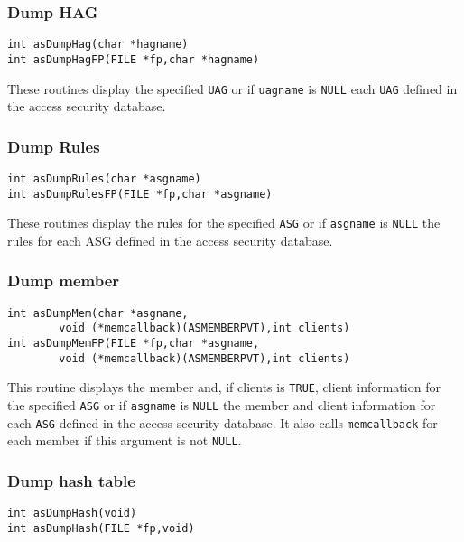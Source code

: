 \subsubsection{Dump HAG}

\begin{verbatim}
int asDumpHag(char *hagname)
int asDumpHagFP(FILE *fp,char *hagname)
\end{verbatim}

These routines display the specified \verb|UAG| or if \verb|uagname| is \verb|NULL| each \verb|UAG| defined in the access security database.

\subsubsection{Dump Rules}

\begin{verbatim}
int asDumpRules(char *asgname)
int asDumpRulesFP(FILE *fp,char *asgname)
\end{verbatim}

These routines display the rules for the specified \verb|ASG| or if \verb|asgname| is \verb|NULL| the rules for each ASG defined in the 
access security database.

\subsubsection{Dump member}

\begin{verbatim}
int asDumpMem(char *asgname,
        void (*memcallback)(ASMEMBERPVT),int clients)
int asDumpMemFP(FILE *fp,char *asgname,
        void (*memcallback)(ASMEMBERPVT),int clients)
\end{verbatim}

This routine displays the member and, if clients is \verb|TRUE|, client information for the specified \verb|ASG| or if \verb|asgname| is \verb|NULL| 
the member and client information for each \verb|ASG| defined in the access security database. It also calls \verb|memcallback| for 
each member if this argument is not \verb|NULL|.

\subsubsection{Dump hash table}

\begin{verbatim}
int asDumpHash(void)
int asDumpHash(FILE *fp,void)
\end{verbatim}

